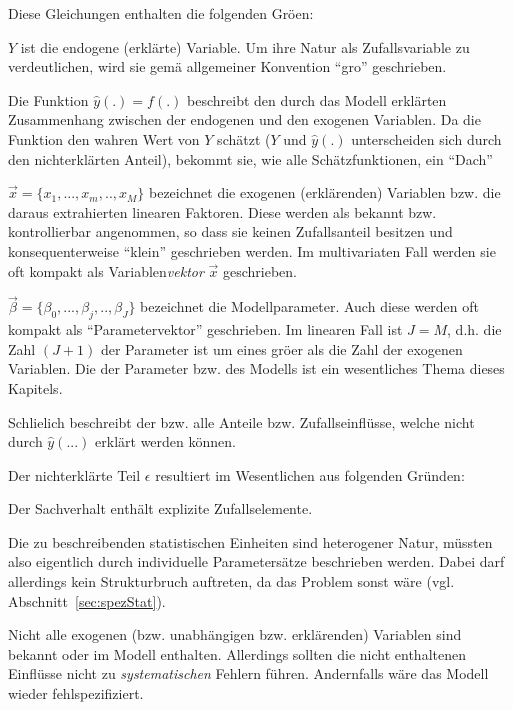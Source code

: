 Diese Gleichungen enthalten die folgenden Gr\"o\3en:
\bi
\item $Y$ ist die endogene  (erkl\"arte) Variable. Um
ihre Natur als Zufallsvariable zu verdeutlichen, wird sie gem\"a\3
allgemeiner Konvention  ``gro\3'' geschrieben.
\item Die Funktion $\hat{y}(.)=f(.)$ beschreibt den durch das Modell
erkl\"arten Zusammenhang zwischen der endogenen und den exogenen
Variablen. 
Da die Funktion den wahren Wert von $Y$ sch\"atzt ($Y$ und
$\hat{y}(.)$ unterscheiden sich  durch den
nichterkl\"arten Anteil), bekommt sie, wie alle Sch\"atzfunktionen,
ein ``Dach''
\item $\vec{x}=\{x_1, ..., x_m, .., x_M\}$
bezeichnet die exogenen (erkl\"arenden)  Variablen bzw. die daraus
extrahierten linearen Faktoren. 
Diese werden als bekannt bzw.
kontrollierbar angenommen, so dass sie keinen Zufallsanteil besitzen
und konsequenterweise ``klein'' geschrieben werden. Im multivariaten
Fall werden sie oft kompakt als Variablen\textit{vektor} $\vec{x}$
geschrieben. 
\item $\vec{\beta}=\{\beta_0, ..., \beta_j, .., \beta_J\}$ bezeichnet die
Modellparameter. Auch diese werden oft kompakt als
``Parametervektor'' geschrieben. Im linearen Fall ist $J=M$, d.h. die
Zahl $(J+1)$ der Parameter ist um eines gr\"o\3er als die Zahl der
exogenen Variablen. Die 
 der Parameter bzw.  des
Modells ist ein wesentliches Thema
 dieses Kapitels.
\item Schlie\3lich beschreibt der 
bzw.   alle Anteile
bzw. Zufallseinfl\"usse, welche nicht durch $\hat{y}(...)$ erkl\"art
werden k\"onnen.

\ei
%
Der nichterkl\"arte Teil $\epsilon$ resultiert im Wesentlichen aus
folgenden Gr\"unden:
\bi
\item Der Sachverhalt enth\"alt explizite Zufallselemente.

\item Die zu beschreibenden statistischen Einheiten sind heterogener
Natur, m\"ussten also eigentlich durch individuelle Parameters\"atze
beschrieben werden. Dabei darf allerdings kein Strukturbruch
auftreten, da das Problem sonst  w\"are
(vgl. Abschnitt~\ref{sec:spezStat}). 

\item Nicht alle exogenen (bzw. unabh\"angigen bzw. erkl\"arenden) 
 Variablen sind bekannt oder im Modell enthalten. Allerdings sollten
die nicht enthaltenen Einfl\"usse nicht zu \emph{systematischen}
Fehlern f\"uhren. Andernfalls w\"are das Modell wieder
fehlspezifiziert.

